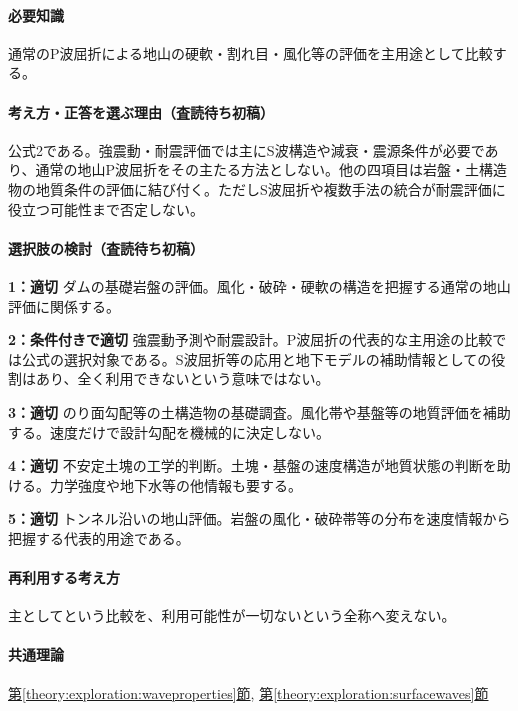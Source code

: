 \paragraph{必要知識} 通常のP波屈折による地山の硬軟・割れ目・風化等の評価を主用途として比較する。

\paragraph{考え方・正答を選ぶ理由（査読待ち初稿）} 公式2である。強震動・耐震評価では主にS波構造や減衰・震源条件が必要であり、通常の地山P波屈折をその主たる方法としない。他の四項目は岩盤・土構造物の地質条件の評価に結び付く。ただしS波屈折や複数手法の統合が耐震評価に役立つ可能性まで否定しない。

\paragraph{選択肢の検討（査読待ち初稿）}\mbox{}\par

\noindent\textbf{1：適切} ダムの基礎岩盤の評価。風化・破砕・硬軟の構造を把握する通常の地山評価に関係する。\par

\noindent\textbf{2：条件付きで適切} 強震動予測や耐震設計。P波屈折の代表的な主用途の比較では公式の選択対象である。S波屈折等の応用と地下モデルの補助情報としての役割はあり、全く利用できないという意味ではない。\par

\noindent\textbf{3：適切} のり面勾配等の土構造物の基礎調査。風化帯や基盤等の地質評価を補助する。速度だけで設計勾配を機械的に決定しない。\par

\noindent\textbf{4：適切} 不安定土塊の工学的判断。土塊・基盤の速度構造が地質状態の判断を助ける。力学強度や地下水等の他情報も要する。\par

\noindent\textbf{5：適切} トンネル沿いの地山評価。岩盤の風化・破砕帯等の分布を速度情報から把握する代表的用途である。\par

\paragraph{再利用する考え方} 主としてという比較を、利用可能性が一切ないという全称へ変えない。

\paragraph{共通理論} \hyperref[theory:exploration:waveproperties]{第\ref*{theory:exploration:waveproperties}節}, \hyperref[theory:exploration:surfacewaves]{第\ref*{theory:exploration:surfacewaves}節}

